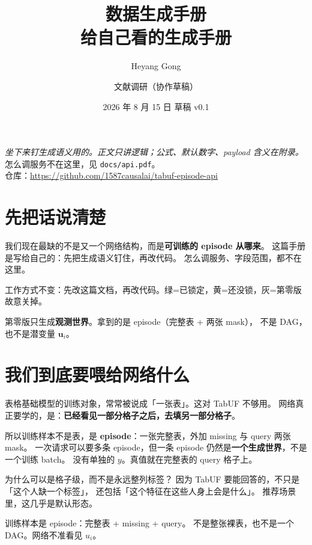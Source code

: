 \documentclass[11pt,a4paper,fontset=none]{ctexart}
\title{\TabUF{} 数据生成手册\\[0.4em]
\large 给自己看的生成手册}
\author{Heyang Gong \and 文献调研（协作草稿）}
\date{2026 年 8 月 15 日 \quad 草稿 v0.1}
\newcommand{\TabUF}{\textsf{TabUF}}
\newcommand{\uu}{\mathbf{u}}
\begin{document}
\maketitle
\vspace{-1.2em}
\begin{center}
\textit{坐下来钉生成语义用的。正文只讲逻辑；公式、默认数字、payload 含义在附录。}\\[0.35em]
怎么调服务不在这里，见 \texttt{docs/api.pdf}。\\[0.35em]
{\small 仓库：\url{https://github.com/1587causalai/tabuf-episode-api}}
\end{center}

\tableofcontents
\newpage

\section{先把话说清楚}

\begin{storybox}
我们现在最缺的不是又一个网络结构，而是\textbf{可训练的 episode 从哪来}。
这篇手册是写给自己的：先把生成语义钉住，再改代码。
怎么调服务、字段范围，都不在这里。
\end{storybox}

工作方式不变：先改这篇文档，再改代码。绿=已锁定，黄=还没锁，灰=第零版故意关掉。

\begin{lockbox}
第零版只生成\textbf{观测世界}。拿到的是 episode（完整表 + 两张 mask），
不是 DAG，也不是潜变量 $\uu_i$。
\end{lockbox}

\section{我们到底要喂给网络什么}

表格基础模型的训练对象，常常被说成「一张表」。这对 \TabUF{} 不够用。
网络真正要学的，是：\textbf{已经看见一部分格子之后，去填另一部分格子}。

所以训练样本不是表，是 \textbf{episode}：一张完整表，外加 missing 与 query 两张 mask。
一次请求可以要多条 episode，但一条 episode 仍然是\textbf{一个生成世界}，不是一个训练 batch。
没有单独的 $y$。真值就在完整表的 query 格子上。

为什么可以是格子级，而不是永远整列标签？
因为 \TabUF{} 要能回答的，不只是「这个人缺一个标签」，
还包括「这个特征在这些人身上会是什么」。
推荐场景里，这几乎是默认形态。

\begin{lockbox}
训练样本是 episode：完整表 + missing + query。
不是整张裸表，也不是一个 DAG。网络不准看见 $u_i$。
\end{lockbox}
\end{document}
